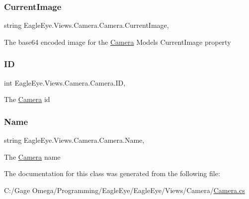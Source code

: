 \subsubsection{\texorpdfstring{CurrentImage}{CurrentImage}}
{\footnotesize\ttfamily string Eagle\+Eye.\+Views.\+Camera.\+Camera.\+Current\+Image\hspace{0.3cm}{\ttfamily [get]}, {\ttfamily [set]}}



The base64 encoded image for the \mbox{\hyperlink{class_eagle_eye_1_1_views_1_1_camera_1_1_camera}{Camera}} Model\textquotesingle{}s Current\+Image property 

\mbox{\label{class_eagle_eye_1_1_views_1_1_camera_1_1_camera_adde1c217f5dec95f622165afd7f1af16}} 
\subsubsection{\texorpdfstring{ID}{ID}}
{\footnotesize\ttfamily int Eagle\+Eye.\+Views.\+Camera.\+Camera.\+ID\hspace{0.3cm}{\ttfamily [get]}, {\ttfamily [set]}}



The \mbox{\hyperlink{class_eagle_eye_1_1_views_1_1_camera_1_1_camera}{Camera}} id 

\mbox{\label{class_eagle_eye_1_1_views_1_1_camera_1_1_camera_aac0993dea066c34a044f51f23194551c}} 
\subsubsection{\texorpdfstring{Name}{Name}}
{\footnotesize\ttfamily string Eagle\+Eye.\+Views.\+Camera.\+Camera.\+Name\hspace{0.3cm}{\ttfamily [get]}, {\ttfamily [set]}}



The \mbox{\hyperlink{class_eagle_eye_1_1_views_1_1_camera_1_1_camera}{Camera}} name 



The documentation for this class was generated from the following file\+:\begin{DoxyCompactItemize}
\item 
C\+:/\+Gage Omega/\+Programming/\+Eagle\+Eye/\+Eagle\+Eye/\+Views/\+Camera/\mbox{\hyperlink{_views_2_camera_2_camera_8cs}{Camera.\+cs}}\end{DoxyCompactItemize}
